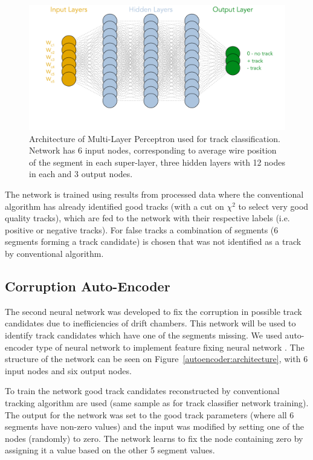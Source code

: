  \begin{figure}[!ht]
\begin{center}
  \includegraphics[width=4.5in]{images/mlp_diagram.pdf}
\caption {Architecture of Multi-Layer Perceptron used for track classification. Network has 6 input nodes, corresponding to average wire position of the segment in each super-layer, three hidden layers with 12 nodes in each and 3 output nodes.}
 \label{mlp:architecture}
 \end{center}
\end{figure}

The network is trained using results from processed data where the conventional algorithm has already 
identified good tracks (with a cut on $\chi^2$ to select very good quality tracks), which are fed to the network with
their respective labels (i.e. positive or negative tracks). For false tracks a combination of segments (6 segments 
forming a track candidate) is chosen that was not identified as a track by conventional algorithm.
 
 \subsection{Corruption Auto-Encoder}
 
The second neural network was developed to fix the corruption in possible track candidates due to 
inefficiencies of drift chambers. This network will be used to identify track candidates which have one of the segments
missing. We used auto-encoder type of neural network to implement feature fixing neural network \cite{Gavalian:2020xmc}. 
The structure of the network can be seen on Figure~\ref{autoencoder:architecture}, with 6 input nodes and six output nodes.

To train the network good track candidates reconstructed by conventional tracking algorithm are used (same sample 
as for track classifier network training). The output for the network was set to the good track parameters (where all 6 
segments have non-zero values) and the input was modified by setting one of the nodes (randomly) to zero. The network
learns to fix the node containing zero by assigning it a value based on the other 5 segment values. 

